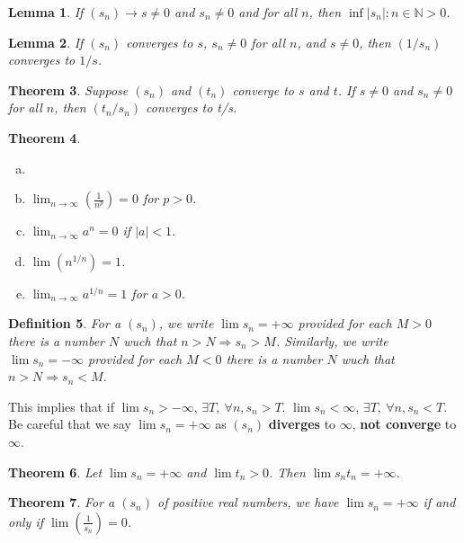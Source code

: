 \documentclass[12pt, lettersize]{book}
\newtheorem{thm}{Theorem}[section]
\newtheorem{dfn}[thm]{Definition}
\newtheorem{lem}[thm]{Lemma}
\newcommand{\N}{\mathbb{N}}
\begin{document}
		\begin{lem}
		If $(s_n)\rightarrow s\neq0$ and $s_n\neq0$ and  for all $n$, then $\inf{|s_n|: n\in\N}>0$.
		\end{lem}
		
		\begin{lem}\label{def:reciprocal}
		If $(s_n)$ converges to $s$, $s_n\neq 0$ for all $n$, and $s\neq 0$, then $(1/s_n)$ converges to $1/s$.
		\end{lem}

	
		\begin{thm}
		Suppose $(s_n)$ and $(t_n)$ converge to $s$ and $t$. If $s\neq 0$ and $s_n\neq 0$ for all $n$, then $(t_n/s_n)$ converges to t/s.
		\end{thm}
		
		\begin{thm}
		\begin{enumerate}[(a)]
			\item[]
			\item $\lim_{n\rightarrow\infty}(\frac{1}{n^p})=0$ for $p>0$.
			\item $\lim_{n\rightarrow\infty}a^n=0$ if $|a|<1$.
			\item $\lim(n^{1/n})=1$.
			\item $\lim_{n\rightarrow\infty}a^{1/n}=1$ for $a>0$.
		\end{enumerate}
		\end{thm}
		
		\begin{dfn}
		For a $(s_n)$, we write $\lim s_n=+\infty$ provided for each $M>0$ there is a number $N$ wuch that $n>N\Rightarrow s_n>M$. Similarly, we write $\lim s_n=-\infty$ provided for each $M<0$ there is a number $N$ wuch that $n>N\Rightarrow s_n<M$.
		\end{dfn}
		This implies that if $\lim s_n>-\infty$, $\exists T,\ \forall n, s_n>T$. $\lim s_n<\infty$, $\exists T,\ \forall n, s_n<T$. 
		Be careful that we say $\lim s_n=+\infty$ as $(s_n)$ \textbf{diverges} to $\infty$, \textbf{not converge} to $\infty$.

		
		\begin{thm}
		Let $\lim s_n=+\infty$ and $\lim t_n>0$. Then $\lim s_nt_n=+\infty$.
		\end{thm}

		
		\begin{thm}
		For a $(s_n)$ of \emph{positive} real numbers, we have $\lim s_n=+\infty$ if and only if $\lim(\frac{1}{s_n})=0$.
		\end{thm}
\end{document}
